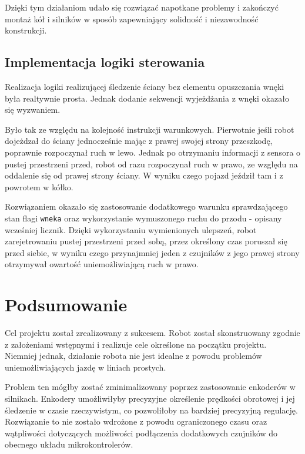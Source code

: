 \documentclass{report}
\begin{document}
Dzięki tym działaniom udało się rozwiązać napotkane problemy i zakończyć montaż kół i silników w sposób zapewniający solidność i niezawodność konstrukcji.

\subsection{\Large Implementacja logiki sterowania}
Realizacja logiki realizującej śledzenie ściany bez elementu opuszczania wnęki była realtywnie prosta. Jednak dodanie sekwencji wyjeżdżania z wnęki okazało się wyzwaniem.

Było tak ze względu na kolejność instrukcji warunkowych. Pierwotnie jeśli robot dojeżdzał do ściany jednocześnie mając z prawej swojej strony przeszkodę, poprawnie rozpoczynał ruch w lewo. Jednak po otrzymaniu informacji z sensora o pustej przestrzeni przed, robot od razu rozpoczynał ruch w prawo, ze względu na oddalenie się od prawej strony ściany. W wyniku czego pojazd jeździł tam i z powrotem w kółko. 

Rozwiązaniem okazało się zastosowanie dodatkowego warunku sprawdzającego stan flagi \texttt{wneka} oraz wykorzystanie wymuszonego ruchu do przodu - opisany wcześniej licznik. Dzięki wykorzystaniu wymienionych ulepszeń, robot zarejetrowaniu pustej przestrzeni przed sobą, przez określony czas poruszał się przed siebie, w wyniku czego przynajmniej jeden z czujników z jego prawej strony otrzymywał owartość uniemożliwiającą ruch w prawo. 


\section{\LARGE Podsumowanie}
%
%

Cel projektu został zrealizowany z sukcesem. Robot został skonstruowany zgodnie z założeniami wstępnymi i realizuje cele określone na początku projektu. Niemniej jednak, działanie robota nie jest idealne z powodu problemów uniemożliwiających jazdę w liniach prostych.

Problem ten mógłby zostać zminimalizowany poprzez zastosowanie enkoderów w silnikach. Enkodery umożliwiłyby precyzyjne określenie prędkości obrotowej i jej śledzenie w czasie rzeczywistym, co pozwoliłoby na bardziej precyzyjną regulację. Rozwiązanie to nie zostało wdrożone z powodu ograniczonego czasu oraz wątpliwości dotyczących możliwości podłączenia dodatkowych czujników do obecnego układu mikrokontrolerów.
\end{document}
